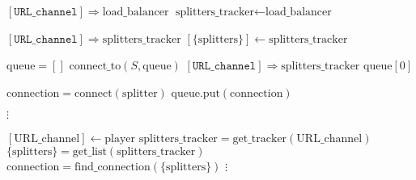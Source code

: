 \documentclass{article}
\begin{document}
\pagestyle{empty}

\newcommand{\send}{\Rightarrow}
\newcommand{\sendto}{\rightarrow}
\algrenewcommand{}
\algrenewcommand\textproc{\textrm}

\begin{algorithmic}

  \State $[\mathtt{URL\_channel}] \send \text{load\_balancer}$
  \State \Return $\text{splitters\_tracker} \gets \text{load\_balancer}$
  \EndFunction
  
  \State $[\mathtt{URL\_channel}] \send \text{splitters\_tracker}$
  \State \Return $[\{\mathrm{splitters}\}] \gets \mathrm{splitters\_tracker}$
  \EndFunction

  \State $\mathrm{queue}=[]$
  \State $\text{connect\_to}(S, \text{queue})$
  \EndFor 
  \State $[\mathtt{URL\_channel}] \send \text{splitters\_tracker}$
  \State \Return $\mathrm{queue}[0]$
  \EndFunction

  \algrenewcommand{}

  \State $\text{connection} = \mathrm{connect}(\text{splitter})$
  \State $\text{queue}.\text{put}(\text{connection})$
  \EndIf
  \EndFunction

  \State $\vdots$
  
  \algrenewcommand{}
  
  \State $[\text{URL\_channel}] \gets \text{player}$
  \State $\text{splitters\_tracker} = \text{get\_tracker}(\text{URL\_channel})$
  \State $\{\text{splitters}\} = \text{get\_list}(\text{splitters\_tracker})$
  \State $\text{connection} = \text{find\_connection}(\{\text{splitters}\})$
  \State $\vdots$
  \EndFunction
  \EndProcedure

\end{algorithmic}
\end{document}
